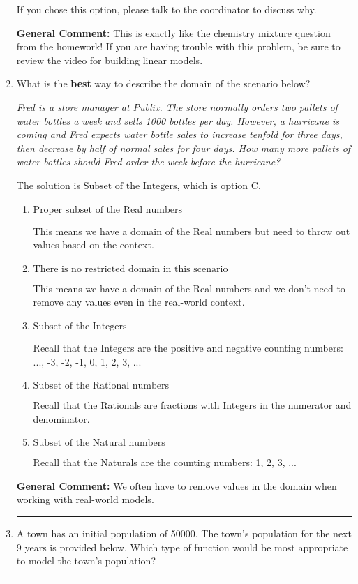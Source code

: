 \documentclass{extbook}[14pt]
\newcommand{\litem}[1]{\item #1

\rule{\textwidth}{0.4pt}}
\begin{document}
\begin{enumerate}
{\begin{enumerate}[label=\Alph*.]
If you chose this option, please talk to the coordinator to discuss why.
\end{enumerate}

\textbf{General Comment:} This is exactly like the chemistry mixture question from the homework! If you are having trouble with this problem, be sure to review the video for building linear models.
}
\litem{
What is the \textbf{best} way to describe the domain of the scenario below?

\begin{center}
    \textit{ Fred is a store manager at Publix. The store normally orders two pallets of water bottles a week and sells 1000 bottles per day. However, a hurricane is coming and Fred expects water bottle sales to increase tenfold for three days, then decrease by half of normal sales for four days. How many more pallets of water bottles should Fred order the week before the hurricane? }
\end{center}
The solution is \( \text{Subset of the Integers} \), which is option C.\begin{enumerate}[label=\Alph*.]
\item \( \text{Proper subset of the Real numbers} \)

This means we have a domain of the Real numbers but need to throw out values based on the context.
\item \( \text{There is no restricted domain in this scenario} \)

This means we have a domain of the Real numbers and we don't need to remove any values even in the real-world context.
\item \( \text{Subset of the Integers} \)

Recall that the Integers are the positive and negative counting numbers: ..., -3, -2, -1, 0, 1, 2, 3, ... 
\item \( \text{Subset of the Rational numbers} \)

Recall that the Rationals are fractions with Integers in the numerator and denominator.
\item \( \text{Subset of the Natural numbers} \)

Recall that the Naturals are the counting numbers: 1, 2, 3, ...
\end{enumerate}

\textbf{General Comment:} We often have to remove values in the domain when working with real-world models.
}
\litem{
A town has an initial population of 50000. The town's population for the next 9 years is provided below. Which type of function would be most appropriate to model the town's population?


}
\end{enumerate}
\end{document}
